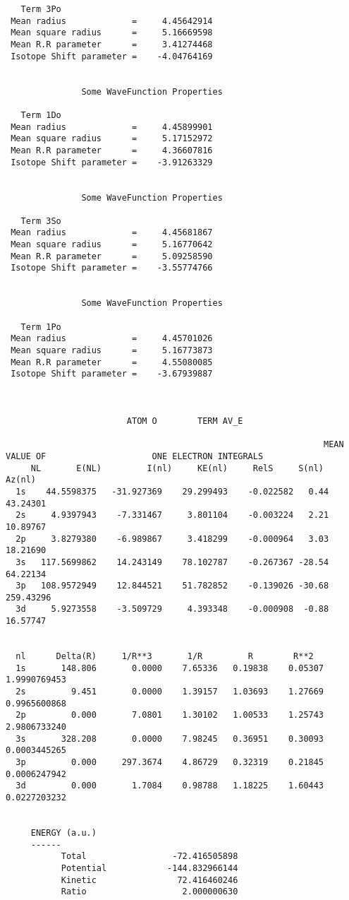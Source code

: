 \documentclass[fleqn,10pt]{book}
\begin{document}
\begin{verbatim}
   Term 3Po
 Mean radius             =     4.45642914
 Mean square radius      =     5.16669598
 Mean R.R parameter      =     3.41274468
 Isotope Shift parameter =    -4.04764169


               Some WaveFunction Properties

   Term 1Do
 Mean radius             =     4.45899901
 Mean square radius      =     5.17152972
 Mean R.R parameter      =     4.36607816
 Isotope Shift parameter =    -3.91263329


               Some WaveFunction Properties

   Term 3So
 Mean radius             =     4.45681867
 Mean square radius      =     5.16770642
 Mean R.R parameter      =     5.09258590
 Isotope Shift parameter =    -3.55774766


               Some WaveFunction Properties

   Term 1Po
 Mean radius             =     4.45701026
 Mean square radius      =     5.16773873
 Mean R.R parameter      =     4.55080085
 Isotope Shift parameter =    -3.67939887



                        ATOM O        TERM AV_E  

                                                               MEAN VALUE OF                     ONE ELECTRON INTEGRALS
     NL       E(NL)         I(nl)     KE(nl)     RelS     S(nl)     Az(nl)
  1s    44.5598375   -31.927369    29.299493    -0.022582   0.44     43.24301
  2s     4.9397943    -7.331467     3.801104    -0.003224   2.21     10.89767
  2p     3.8279380    -6.989867     3.418299    -0.000964   3.03     18.21690
  3s   117.5699862    14.243149    78.102787    -0.267367 -28.54     64.22134
  3p   108.9572949    12.844521    51.782852    -0.139026 -30.68    259.43296
  3d     5.9273558    -3.509729     4.393348    -0.000908  -0.88     16.57747                                                                                                                 


  nl      Delta(R)     1/R**3       1/R         R        R**2
  1s       148.806       0.0000    7.65336   0.19838    0.05307 1.9990769453
  2s         9.451       0.0000    1.39157   1.03693    1.27669 0.9965600868
  2p         0.000       7.0801    1.30102   1.00533    1.25743 2.9806733240
  3s       328.208       0.0000    7.98245   0.36951    0.30093 0.0003445265
  3p         0.000     297.3674    4.86729   0.32319    0.21845 0.0006247942
  3d         0.000       1.7084    0.98788   1.18225    1.60443 0.0227203232


     ENERGY (a.u.)
     ------
           Total                 -72.416505898
           Potential            -144.832966144
           Kinetic                72.416460246
           Ratio                   2.000000630                        
\end{verbatim}
\end{document}
